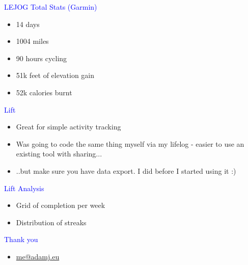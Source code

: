 \documentclass[landscape]{slides}
\begin{document}
\begin{slide}

    \textcolor{blue}{\Large{LEJOG Total Stats (Garmin)}}

    \begin{itemize}
        \item 14 days
        \item 1004 miles
        \item 90 hours cycling
        \item 51k feet of elevation gain
        \item 52k calories burnt
    \end{itemize}

\end{slide}




\begin{slide}

    \textcolor{blue}{\Large{Lift}}

    \begin{itemize}
        \item Great for simple activity tracking
        \item Was going to code the same thing myself via my lifelog - easier
              to use an existing tool with sharing...
        \item ..but make sure you have data export. I did before I started using it :)
    \end{itemize}

\end{slide}



\begin{slide}

    \textcolor{blue}{\Large{Lift Analysis}}

    \begin{itemize}
        \item Grid of completion per week
        \item Distribution of streaks
    \end{itemize}

\end{slide}



\begin{slide}
    \textcolor{blue}{\Large{Thank you}}

    \begin{itemize}
        \item \url{me@adamj.eu}
    \end{itemize}

\end{slide}
\end{document}
